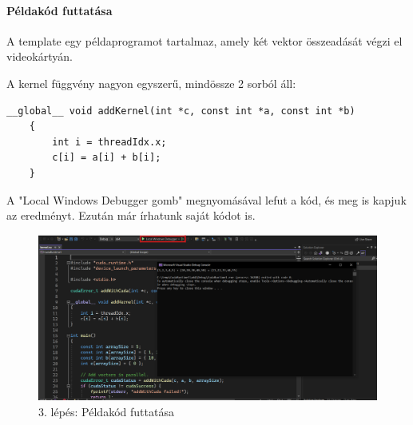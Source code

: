 \paragraph{Példakód futtatása}
A template egy példaprogramot tartalmaz, amely két vektor összeadását végzi el videokártyán.

A kernel függvény nagyon egyszerű, mindössze 2 sorból áll: \cite{CUDAdoc}
\begin{lstlisting}[style=CStyle]
	__global__ void addKernel(int *c, const int *a, const int *b)
	{
		int i = threadIdx.x;
		c[i] = a[i] + b[i];
	}
\end{lstlisting} 

A "Local Windows Debugger gomb" megnyomásával lefut a kód, és meg is kapjuk az eredményt. Ezután már írhatunk saját kódot is.

\begin{figure}[ht!]
	\centering
	\includegraphics[width=150mm, keepaspectratio] {figures/install-3.png}
	\caption{3. lépés: Példakód futtatása}
\end{figure}
